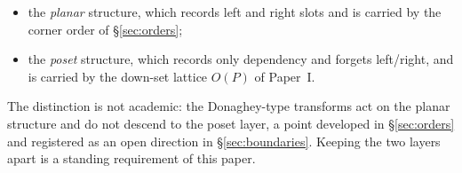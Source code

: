 \begin{itemize}
\item the \emph{planar} structure, which records left and right slots and is carried
  by the corner order of \S\ref{sec:orders};
\item the \emph{poset} structure, which records only dependency and forgets
  left/right, and is carried by the down-set lattice $O(P)$ of Paper~I.
\end{itemize}

The distinction is not academic: the Donaghey-type transforms act on the planar
structure and do not descend to the poset layer, a point developed in
\S\ref{sec:orders} and registered as an open direction in
\S\ref{sec:boundaries}.  Keeping the two layers apart is a standing requirement of
this paper.

